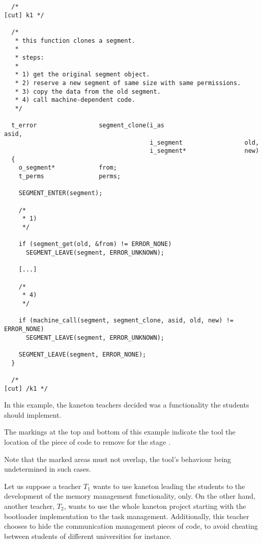 \begin{verbatim}
  /*                                                                [cut] k1 */

  /*
   * this function clones a segment.
   *
   * steps:
   *
   * 1) get the original segment object.
   * 2) reserve a new segment of same size with same permissions.
   * 3) copy the data from the old segment.
   * 4) call machine-dependent code.
   */

  t_error                 segment_clone(i_as                      asid,
                                        i_segment                 old,
                                        i_segment*                new)
  {
    o_segment*            from;
    t_perms               perms;

    SEGMENT_ENTER(segment);

    /*
     * 1)
     */

    if (segment_get(old, &from) != ERROR_NONE)
      SEGMENT_LEAVE(segment, ERROR_UNKNOWN);

    [...]

    /*
     * 4)
     */

    if (machine_call(segment, segment_clone, asid, old, new) != ERROR_NONE)
      SEGMENT_LEAVE(segment, ERROR_UNKNOWN);

    SEGMENT_LEAVE(segment, ERROR_NONE);
  }

  /*                                                               [cut] /k1 */
\end{verbatim}

In this example, the kaneton teachers decided 
was a functionality the students should implement.

The markings at the top  and bottom  of this
example indicate the  tool the location of the piece of code
to remove for the stage .

Note that the marked areas must not overlap, the  tool's
behaviour being undetermined in such cases.

Let us suppose a teacher $T_{1}$ wants to use kaneton leading the students to
the development of the memory management functionality, only. On the other
hand, another teacher, $T_{2}$, wants to use the whole kaneton project starting
with the bootloader implementation to the task management. Additionally,
this teacher chooses to hide the communication management pieces of code,
to avoid cheating between students of different universities for instance.

